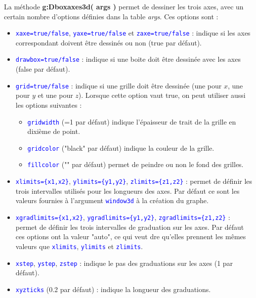 \documentclass[%
10pt,%
a4paper,%
french,%
]%
{article}%
\begin{document}
La méthode \textbf{g:Dboxaxes3d( args )} permet de dessiner les trois axes, avec un certain nombre d'options définies dans la table \emph{args}. Ces options sont :
\def\opt#1{\textcolor{blue}{\texttt{#1}}}%
\begin{itemize}
    \item \opt{xaxe=true/false}, \opt{yaxe=true/false} et \opt{zaxe=true/false} : indique si les axes correspondant doivent être dessinés ou non (true par défaut).

    \item \opt{drawbox=true/false} : indique si une boite doit être dessinée avec les axes (false par défaut).

    \item \opt{grid=true/false} : indique si une grille doit être dessinée (une pour $x$, une pour $y$ et une pour $z$). Lorsque cette option vaut true, on peut utiliser aussi les options suivantes :
        \begin{itemize}
            \item \opt{gridwidth} (=1 par défaut) indique l'épaisseur de trait de la grille en dixième de point.
            \item \opt{gridcolor} ("black" par défaut) indique la couleur de la grille.
            \item \opt{fillcolor} ("" par défaut) permet de peindre ou non le fond des grilles.
        \end{itemize}
    
    \item \opt{xlimits=\{x1,x2\}}, \opt{ylimits=\{y1,y2\}}, \opt{zlimits=\{z1,z2\}} : permet de définir les trois intervalles utilisés pour les longueurs des axes. Par défaut ce sont les valeurs fournies à l'argument \opt{window3d} à la création du graphe.

    \item \opt{xgradlimits=\{x1,x2\}}, \opt{ygradlimits=\{y1,y2\}}, \opt{zgradlimits=\{z1,z2\}} : permet de définir les trois intervalles de graduation sur les axes. Par défaut ces options ont la valeur "auto", ce qui veut dre qu'elles prennent les mêmes valeurs que \opt{xlimits}, \opt{ylimits} et \opt{zlimits}.

    \item \opt{xstep}, \opt{ystep}, \opt{zstep} : indique le pas des graduations sur les axes (1 par défaut).

    \item \opt{xyzticks} (0.2 par défaut) : indique la longueur des graduations.


\end{itemize}
\end{document}

